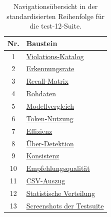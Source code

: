 \clearpage
{}\label{app:block_test12}

\begin{table}[htbp]
\centering
\setlength{\tabcolsep}{5pt}
\renewcommand{\arraystretch}{1.15}
\caption[Template-Reihenfolge test-12]{Navigationsübersicht in der standardisierten Reihenfolge für die test-12-Suite.}
\begin{tabular}{|c|p{11.4cm}|}
\hline
\textbf{Nr.} & \textbf{Baustein} \\
\hline
1 & \hyperref[app:accessibility_verstoesse_12]{Violations-Katalog} \\
\hline
2 & \hyperref[app:erkennungsrate_poc_12]{Erkennungsrate} \\
\hline
3 & \hyperref[app:recall_matrix_12]{Recall-Matrix} \\
\hline
4 & \hyperref[app:rohdaten_12]{Rohdaten} \\
\hline
5 & \hyperref[app:modell_summary_12]{Modellvergleich} \\
\hline
6 & \hyperref[app:token_economy_12]{Token-Nutzung} \\
\hline
7 & \hyperref[app:effizienz_metriken_12]{Effizienz} \\
\hline
8 & \hyperref[app:overdetection_12]{Über-Detektion} \\
\hline
9 & \hyperref[app:detektor_konsistenz_12]{Konsistenz} \\
\hline
10 & \hyperref[app:empfehlungsqualitaet_12]{Empfehlungsqualität} \\
\hline
11 & \hyperref[app:csv_export_12]{CSV-Auszug} \\
\hline
12 & \hyperref[app:statistik_quantile_12]{Statistische Verteilung} \\
\hline
13 & \hyperref[app:screenshots_test12]{Screenshots der Testsuite} \\
\hline
\end{tabular}
\label{tab:template_test12}
\end{table}

\clearpage

\label{app:accessibility_verstoesse_12}

